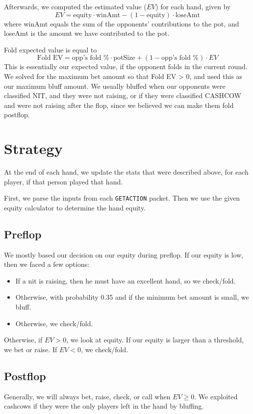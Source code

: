 \documentclass{article}
\begin{document}
Afterwards, we computed the estimated value ($EV$) for each hand, given by
\[ EV = \text{equity} \cdot \text{winAmt} - (1-\text{equity}) \cdot \text{loseAmt} \]
where winAmt equals the sum of the opponents' contributions to the pot, and loseAmt is the amount we have contributed to the pot.

Fold expected value is equal to
\[ \text{Fold EV} =  \text{opp's fold \%} \cdot \text{potSize} + (1 - \text{opp's fold \%}) \cdot EV \]
This is essentially our expected value, if the opponent folds in the current round. We solved for the maximum bet amount so that Fold EV > 0, and used this as our maximum bluff amount. We usually bluffed when our opponents were classified NIT, and they were not raising, or if they were classified CASHCOW and were not raising after the flop, since we believed we can make them fold postflop.
\section*{Strategy}
At the end of each hand, we update the stats that were described above, for each player, if that person played that hand.

First, we parse the inputs from each \texttt{GETACTION} packet. Then we use the given equity calculator to determine the hand equity.

\subsection*{Preflop}
We mostly based our decision on our equity during preflop. If our equity is low, then we faced a few options:
\begin{itemize}
\item If a nit is raising, then he must have an excellent hand, so we check/fold.
\item Otherwise, with probability 0.35 and if the minimum bet amount is small, we bluff.
\item Otherwise, we check/fold.
\end{itemize}
Otherwise, if $EV > 0$, we look at equity. If our equity is larger than a threshold, we bet or raise. If $EV < 0$, we check/fold.


\subsection*{Postflop}
Generally, we will always bet, raise, check, or call when $EV \ge 0$. We exploited cashcows if they were the only players left in the hand by bluffing.
\end{document}
